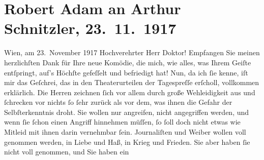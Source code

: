 

               \section[Robert Adam an Arthur Schnitzler, 23. 11. 1917]{ Robert Adam an Arthur Schnitzler, 23. 11. 1917}\nopagebreak{}\rehead{ }\begin{ledgroupsized}[t]{13cm}\normalsize\beginnumbering{} \toendnotes[C]{\smallbreak\pagebreak[2]} 
\toendnotes[C]{\smallbreak}\pstart
           \raggedleft{}{\pb}Wien, am 23. November 1917\pend
           \pstart\center{}Hochverehrter Herr Doktor!\pend\pstart
           Empfangen Sie meinen herzlichſten Dank für Ihre neue Komödie, die mich, wie alles, was Ihrem Geiſte entſpringt,
               auf’s Höchſte gefeſſelt und befriedigt hat!\pend
           \pstart
           Nun, da ich ſie kenne, iſt mir das Geſchrei, das in den Theaterurteilen der
               Tagespreſſe erſcholl, vollkommen erklärlich. Die Herren zeichnen ſich vor allem durch
               große Wehleidigkeit aus und ſchrecken vor nichts ſo ſehr zurück als vor dem, was
               ihnen die Gefahr der Selbſterkenntnis droht. Sie wollen nur angreifen, nicht
               angegriffen werden, und wenn ſie ſchon einen Angriff hinnehmen müſſen, ſo ſoll doch
               nicht etwas wie Mitleid mit ihnen {\pb}darin
               vernehmbar ſein. Journaliſten und Weiber wollen voll genommen werden, in Liebe und
               Haß, in Krieg und Frieden. Sie aber haben ſie nicht voll genommen, und Sie haben ein

\end{ledgroupsized}

